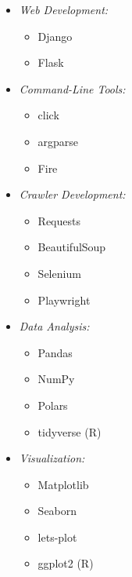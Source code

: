 \begin{multicols}{3} %
\begin{itemize}  
    \item \textit{Web Development:}  
    \begin{itemize}  
        \item Django  
        \item Flask  
    \end{itemize}  
  
    \item \textit{Command-Line Tools:}  
    \begin{itemize}  
        \item click  
        \item argparse  
        \item Fire  
    \end{itemize}  
  
    \item \textit{Crawler Development:}  
    \begin{itemize}  
        \item Requests  
        \item BeautifulSoup  
        \item Selenium  
        \item Playwright  
    \end{itemize}  
  
    \item \textit{Data Analysis:}  
    \begin{itemize}  
        \item Pandas  
        \item NumPy  
        \item Polars  
        \item tidyverse (R)  
    \end{itemize}  
\end{itemize}  
  
\columnbreak %
  
\begin{itemize}  
    \item \textit{Visualization:}  
    \begin{itemize}  
        \item Matplotlib  
        \item Seaborn  
        \item lets-plot  
        \item ggplot2 (R)  
    \end{itemize}  


\end{itemize}
\end{multicols}
